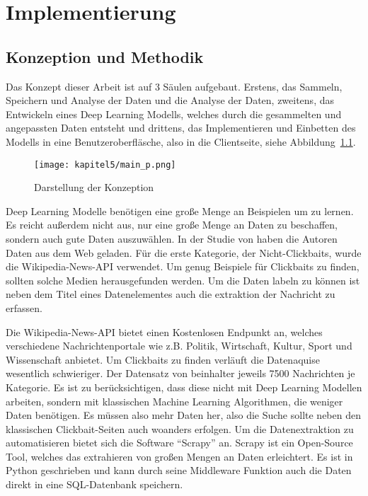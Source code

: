 \chapter{Implementierung}
\section{Konzeption und Methodik}


Das Konzept dieser Arbeit ist auf 3 Säulen aufgebaut. Erstens, das Sammeln, Speichern und Analyse der Daten und die Analyse der Daten, zweitens, das Entwickeln eines Deep Learning Modells, welches durch die gesammelten und angepassten Daten entsteht und drittens, das Implementieren und Einbetten des Modells in eine Benutzeroberfläsche, also in die Clientseite, siehe Abbildung~\ref{Kap5:Konzeption}.

\begin{figure}[H]
    \centering
    \texttt{[image: kapitel5/main\_p.png]}
    \caption[Darstellung der Konzeption]{Darstellung der Konzeption}
    \label{Kap5:Konzeption}
\end{figure}


Deep Learning Modelle benötigen eine große Menge an Beispielen um zu lernen. Es reicht außerdem nicht aus, nur eine große Menge an Daten zu beschaffen, sondern auch gute Daten auszuwählen. In der Studie von \cite*{Chakrabortya} haben die Autoren Daten aus dem Web geladen. Für die erste Kategorie, der Nicht-Clickbaits, wurde die Wikipedia-News-API verwendet. Um genug Beispiele für Clickbaits zu finden, sollten solche Medien herausgefunden werden. Um die Daten labeln zu können ist neben dem Titel eines Datenelementes auch die extraktion der Nachricht zu erfassen.

Die Wikipedia-News-API bietet einen Kostenlosen Endpunkt an, welches verschiedene Nachrichtenportale wie z.B. Politik, Wirtschaft, Kultur, Sport und Wissenschaft anbietet. Um Clickbaits zu finden verläuft die Datenaquise wesentlich schwieriger. Der Datensatz von \cite*{Chakrabortya} beinhalter jeweils 7500 Nachrichten je Kategorie. Es ist zu berücksichtigen, dass diese nicht mit Deep Learning Modellen arbeiten, sondern mit klassischen Machine Learning Algorithmen, die weniger Daten benötigen. Es müssen also mehr Daten her, also die Suche sollte neben den klassischen Clickbait-Seiten auch woanders erfolgen. Um die Datenextraktion zu automatisieren bietet sich die Software \enquote{Scrapy} an. Scrapy ist ein Open-Source Tool, welches das extrahieren von großen Mengen an Daten erleichtert. Es ist in Python geschrieben und kann durch seine Middleware Funktion auch die Daten direkt in eine SQL-Datenbank speichern.

